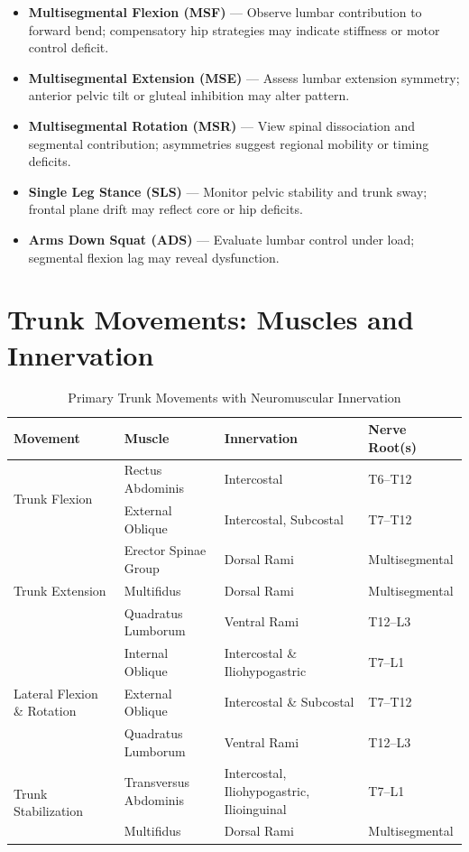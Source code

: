 \begin{itemize}
  \item \textbf{Multisegmental Flexion (MSF)} — Observe lumbar contribution to forward bend; compensatory hip strategies may indicate stiffness or motor control deficit.
  \item \textbf{Multisegmental Extension (MSE)} — Assess lumbar extension symmetry; anterior pelvic tilt or gluteal inhibition may alter pattern.
  \item \textbf{Multisegmental Rotation (MSR)} — View spinal dissociation and segmental contribution; asymmetries suggest regional mobility or timing deficits.
  \item \textbf{Single Leg Stance (SLS)} — Monitor pelvic stability and trunk sway; frontal plane drift may reflect core or hip deficits.
  \item \textbf{Arms Down Squat (ADS)} — Evaluate lumbar control under load; segmental flexion lag may reveal dysfunction.
\end{itemize}

\section*{Trunk Movements: Muscles and Innervation}

\begin{table}[H]
\centering
\captionsetup{justification=raggedright, singlelinecheck=false}
\begin{tabular}{|p{4cm}|p{5cm}|p{4cm}|p{2.5cm}|}
\hline
\textbf{Movement} & \textbf{Muscle} & \textbf{Innervation} & \textbf{Nerve Root(s)} \\
\hline
\multirow{2}{*}{Trunk Flexion}
  & Rectus Abdominis & Intercostal & T6–T12 \\
  & External Oblique & Intercostal, Subcostal & T7–T12 \\
\hline
\multirow{3}{*}{Trunk Extension}
  & Erector Spinae Group & Dorsal Rami & Multisegmental \\
  & Multifidus & Dorsal Rami & Multisegmental \\
  & Quadratus Lumborum & Ventral Rami & T12–L3 \\
\hline
\multirow{3}{*}{Lateral Flexion \& Rotation}
  & Internal Oblique & Intercostal \& Iliohypogastric & T7–L1 \\
  & External Oblique & Intercostal \& Subcostal & T7–T12 \\
  & Quadratus Lumborum & Ventral Rami  & T12–L3 \\
\hline
\multirow{2}{*}{Trunk Stabilization}
  & Transversus Abdominis & Intercostal, Iliohypogastric, Ilioinguinal & T7–L1 \\
  & Multifidus & Dorsal Rami & Multisegmental \\
\hline
\end{tabular}
\caption{Primary Trunk Movements with Neuromuscular Innervation}
\end{table}

